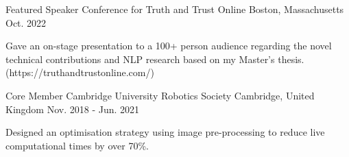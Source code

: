 

\begin{cventries}

\cventry
{Featured Speaker} %
{Conference for Truth and Trust Online} %
{Boston, Massachusetts} %
{Oct. 2022} %
{
  \begin{cvitems} %
    \item {Gave an on-stage presentation to a 100+ person audience regarding the novel technical contributions and NLP research based on my Master's thesis. (https://truthandtrustonline.com/)}
  \end{cvitems}
}

  \cventry
    {Core Member} %
    {Cambridge University Robotics Society} %
    {Cambridge, United Kingdom} %
    {Nov. 2018 - Jun. 2021} %
    {
      \begin{cvitems} %
        \item {Designed an optimisation strategy using image pre-processing to reduce live computational times by over 70\%.}
      \end{cvitems}
    }

\end{cventries}
